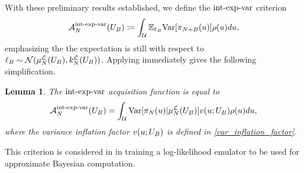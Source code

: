 \documentclass[12pt]{article}
\newtheorem{lemma}{Lemma}
\begin{document}
With these preliminary results established, we define the $\intExpVarLabel$ criterion
\begin{align}
\labelAcq[\Ndesign]{\intExpVarLabel}(\designBatchIn) \Def
\int_{\parSpace} \E_{\designBatchLlik} \Var[\llikEmRdmDens[\Naugment](\Par)] \weightDens(\Par) d\Par, 
\end{align}
emphasizing the the expectation is still with respect to 
$\designBatchLlik \sim \Gaussian(\emMean[\Ndesign]{\llik}(\designBatchIn), \emKer[\Ndesign]{\llik}(\designBatchIn))$. 
Applying  immediately gives the following simplification. 
\begin{lemma}
The $\intExpVarLabel$ acquisition function is equal to 
\begin{align}
\labelAcq[\Ndesign]{\intExpVarLabel}(\designBatchIn) =
\int_{\parSpace} \Var[\llikEmRdmDens[\Ndesign](\Par) | \emMean[\Ndesign]{\llik}(\designBatchIn)]
	\varInflation(\Par; \designBatchIn) \weightDens(\Par) d\Par, 
\end{align}
where the variance inflation factor $\varInflation(\Par; \designBatchIn)$ is defined in \ref{var_inflation_factor}. 
\end{lemma}
This criterion is considered in \cite{VehtariParallelGP} in training a log-likelihood emulator to be used for 
approximate Bayesian computation. 
\end{document}
